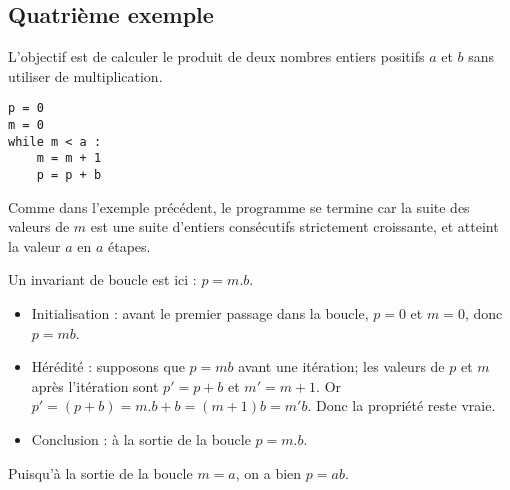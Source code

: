 \subsection{Quatrième exemple }
L’objectif est de calculer le produit de deux nombres entiers positifs $a$ et $b$ sans utiliser de multiplication.
\begin{lstlisting}
p = 0
m = 0
while m < a :
    m = m + 1
    p = p + b
\end{lstlisting}

Comme dans l’exemple précédent, le programme se termine car la suite des valeurs de $m$ est une suite
d’entiers consécutifs strictement croissante, et atteint la valeur $a$ en $a$ étapes.

Un invariant de boucle est ici : $p = m.b$.

\begin{itemize}
\item Initialisation : avant le premier passage dans la boucle, $p = 0$ et $m = 0$, donc $p = mb$.
\item Hérédité : supposons que $p = mb$ avant une itération; les valeurs de $p$ et $m$ après l’itération sont
$p'= p + b$ et $m' = m + 1$. Or $p'= (p + b) = m.b + b = (m + 1)b = m'b$. Donc la propriété
reste vraie.
\item Conclusion : à la sortie de la boucle $p = m.b$.
\end{itemize}
Puisqu’à la sortie de la boucle $m = a$, on a bien $p = ab$.